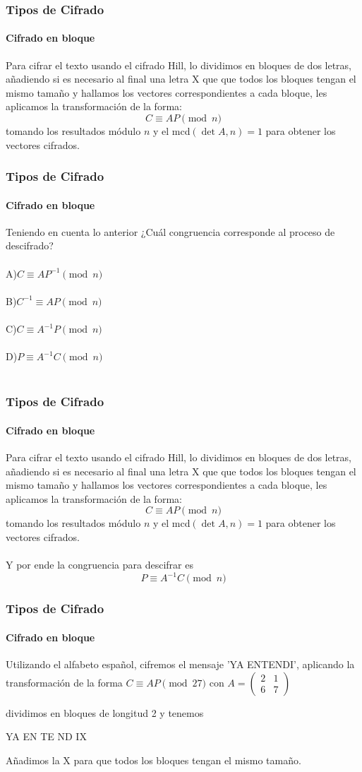 \documentclass[spanish, mexico]{beamer}
\begin{document}
	\begin{frame}
		\frametitle{Tipos de Cifrado}
		\framesubtitle{Cifrado en bloque}
		 Para cifrar el texto usando el cifrado Hill, lo dividimos en bloques de dos letras, añadiendo si es necesario al final una letra X que que todos los bloques tengan el mismo tamaño y hallamos los vectores correspondientes a cada bloque, les aplicamos la transformación de la forma:
		 $$C \equiv AP \pmod{n}$$
		 tomando los resultados módulo $n$ y el mcd$(\det A, n) = 1$ para obtener los vectores cifrados.
	\end{frame}
	
	\begin{frame}
		\frametitle{Tipos de Cifrado}
		\framesubtitle{Cifrado en bloque}
		 Teniendo en cuenta lo anterior ¿Cuál congruencia corresponde al proceso de descifrado?\\~\\
		 A)$C \equiv AP^{-1} \pmod{n}$\\~\\
		 B)$C^{-1} \equiv AP \pmod{n}$\\~\\
		 C)$C \equiv A^{-1}P \pmod{n}$\\~\\
		 D)$P \equiv A^{-1}C \pmod{n}$\\~\\
	\end{frame}
	
	\begin{frame}
		\frametitle{Tipos de Cifrado}
		\framesubtitle{Cifrado en bloque}
		 Para cifrar el texto usando el cifrado Hill, lo dividimos en bloques de dos letras, añadiendo si es necesario al final una letra X que que todos los bloques tengan el mismo tamaño y hallamos los vectores correspondientes a cada bloque, les aplicamos la transformación de la forma:
		 $$C \equiv AP \pmod{n}$$
		 tomando los resultados módulo $n$ y el mcd$(\det A, n) = 1$ para obtener los vectores cifrados.\\~\\
		 Y por ende la congruencia para descifrar es
		 $$P \equiv A^{-1}C \pmod{n}$$
	\end{frame}
	
	\begin{frame}
		\frametitle{Tipos de Cifrado}
		\framesubtitle{Cifrado en bloque}
		 \begin{example}
		    Utilizando el alfabeto español, cifremos el mensaje 'YA ENTENDI', aplicando la transformación de la forma $C \equiv AP \pmod{27}$ con $A = \begin{pmatrix}2 & 1\\ 6 & 7\end{pmatrix}$
		 \end{example}
		 \begin{solution}
		    dividimos en bloques de longitud 2 y tenemos
		    \begin{center}
		        YA EN TE ND IX
		    \end{center}
		    Añadimos la X para que todos los bloques tengan el mismo tamaño.
		 \end{solution}
	\end{frame}
	
\end{document}
